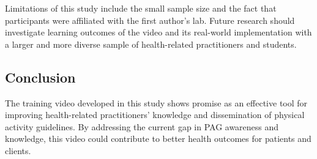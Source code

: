 \documentclass[
  man,
  longtable,
  nolmodern,
  notxfonts,
  notimes,
  colorlinks=true,linkcolor=blue,citecolor=blue,urlcolor=blue]{apa7}
\begin{document}
Limitations of this study include the small sample size and the fact
that participants were affiliated with the first author's lab. Future
research should investigate learning outcomes of the video and its
real-world implementation with a larger and more diverse sample of
health-related practitioners and students.

\subsection{Conclusion}\label{conclusion}

The training video developed in this study shows promise as an effective
tool for improving health-related practitioners' knowledge and
dissemination of physical activity guidelines. By addressing the current
gap in PAG awareness and knowledge, this video could contribute to
better health outcomes for patients and clients.
\end{document}
